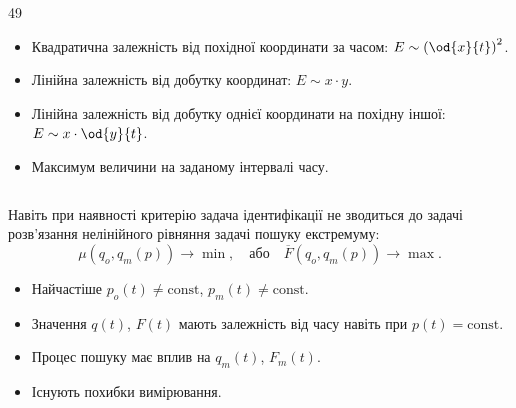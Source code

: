 \documentclass[14pt,handout,utf8]{beamer}
\newlength\TW
\begin{document}
\begin{frame}
\begin{columns}
\begin{column}{49\TW}
\begin{itemize}
        \item
          Квадратична залежність від похідної координати за часом:
          $E \sim \left( \od{x}{t}\right)^2$.

        \item
          Лінійна залежність від добутку координат:
          $E \sim x \cdot y$.

        \item
          Лінійна залежність від добутку однієї координати на похідну іншої:
          $E \sim x \cdot \od{y}{t}$.

        \item
          Максимум величини на заданому інтервалі часу.

      \end{itemize}

    \end{column}
  \end{columns}

  \vfill

  Навіть при наявності критерію задача ідентифікації не зводиться до
  задачі розв'язання нелінійного рівняння
  задачі пошуку екстремуму:
\[
  \mu( q_o, q_m(p) ) \to \min,
  \quad
  \text{або}
  \quad
  \overline{F}(q_o, q_m(p)) \to \max.
\]

\begin{itemize}

  \item
    Найчастіше
    $p_o(t) \ne \mathrm{const}$,
    $p_m(t) \ne \mathrm{const}$.


  \item
    Значення $q(t)$, $F(t)$ мають залежність від часу
    навіть при $p(t) = \mathrm{const}$.

  \item
    Процес пошуку має вплив на $q_m(t)$, $F_m(t)$.

  \item
    Існують похибки вимірювання.

\end{itemize}


\end{frame}



\end{document}
